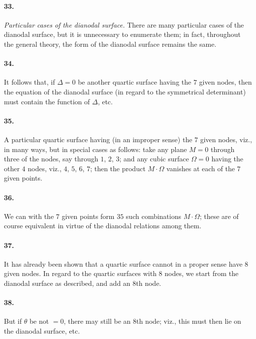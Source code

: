 \documentclass[11pt,a4paper]{article}
\begin{document}
\paragraph{33.}
\textit{Particular cases of the dianodal surface.}
There are many particular cases of the dianodal surface, but it is unnecessary to
enumerate them; in fact, throughout the general theory, the form of the dianodal surface
remains the same.

\paragraph{34.}
It follows that, if $\Delta = 0$ be another quartic surface having the $7$ given nodes,
then the equation of the dianodal surface (in regard to the symmetrical determinant)
must contain the function of $\Delta$, etc.

\paragraph{35.}
A particular quartic surface having (in an improper sense) the $7$ given nodes, viz.,
in many ways, but in special cases as follows: take any plane $M = 0$ through three of
the nodes, say through $1$, $2$, $3$; and any cubic surface $\Omega = 0$ having the other
$4$ nodes, viz., $4$, $5$, $6$, $7$; then the product $M \cdot \Omega$ vanishes at each of
the $7$ given points.

\paragraph{36.}
We can with the $7$ given points form $35$ such combinations $M \cdot \Omega$; these are
of course equivalent in virtue of the dianodal relations among them.

\paragraph{37.}
It has already been shown that a quartic surface cannot in a proper sense have $8$ given
nodes. In regard to the quartic surfaces with $8$ nodes, we start from the dianodal
surface as described, and add an $8$th node.

\paragraph{38.}
But if $\theta$ be not $= 0$, there may still be an $8$th node; viz., this must then lie
on the dianodal surface, etc.
\end{document}
